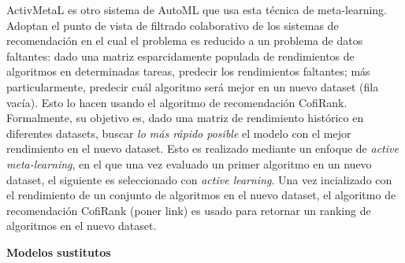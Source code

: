 ActivMetaL es otro sistema de AutoML que usa esta técnica de meta-learning. Adoptan el punto de vista de filtrado colaborativo de los sistemas de recomendación en el cual el problema es reducido a un problema de datos faltantes: dado una matriz esparcidamente populada de rendimientos de algoritmos en determinadas tareas, predecir los rendimientos faltantes; más particularmente, predecir cuál algoritmo será mejor en un nuevo dataset (fila vacía). Esto lo hacen usando el algoritmo de recomendación CofiRank. Formalmente, su objetivo es, dado una matriz de rendimiento histórico en diferentes datasets, buscar \textit{lo más rápido posible} el modelo con el mejor rendimiento en el nuevo dataset. Esto es realizado mediante un enfoque de \textit{active meta-learning}, en el que una vez evaluado un primer algoritmo en un nuevo dataset, el siguiente es seleccionado con \textit{active learning}. Una vez incializado con el rendimiento de un conjunto de algoritmos en el nuevo dataset, el algoritmo de recomendación CofiRank (poner link) es usado para retornar un ranking de algoritmos en el nuevo dataset. %

\quad

\textbf{Modelos sustitutos}


